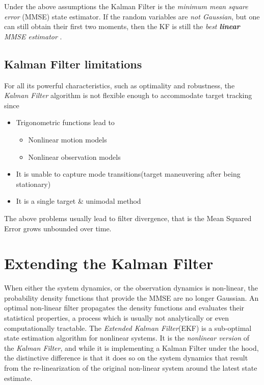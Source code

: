 Under the above assumptions the Kalman Filter is the \emph{minimum mean square error }(MMSE) state estimator. If the random variables are \emph{not Gaussian}, but one can still obtain their first two moments, then the KF is still the \emph{best \textbf{linear} MMSE estimator} \cite{Shalom1995}.

\subsection{Kalman Filter limitations}

For all its powerful characteristics, such as optimality and robustness, the \emph{Kalman Filter} algorithm is not flexible enough to accommodate target tracking \cite{Shalom1995} since

\begin{itemize}
	\item Trigonometric functions lead to
		\begin{itemize}
			\item Nonlinear motion models
			\item Nonlinear observation models
		\end{itemize}
	\item It is unable to capture mode transitions(target maneuvering after being stationary)
	\item It is a single target \& unimodal method
\end{itemize}

The above problems usually lead to filter divergence, that is the Mean Squared Error grows unbounded over time.

\section{Extending the Kalman Filter}

When either the system dynamics, or the observation dynamics is non-linear, the probability density functions that provide the MMSE are no longer Gaussian. An optimal non-linear filter propagates the density functions and evaluates their statistical properties, a process which is usually not analytically or even computationally tractable. The \emph{Extended Kalman Filter}(EKF) is a sub-optimal state estimation algorithm for nonlinear systems. It is the \emph{nonlinear version} of the \emph{Kalman Filter}, and while it is implementing a Kalman Filter under the hood, the distinctive difference is that it does so on the system dynamics that result from the re-linearization of the original non-linear system around the latest state estimate.
